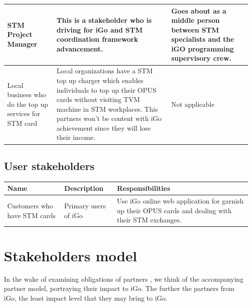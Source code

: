 \documentclass[11pt, english]{report}
\begin{document}
\begin{longtable}[!htbp]{ |p{3cm}|p{7cm}|p{3cm}| }
\hline
STM Project Manager &
This is a stakeholder who is driving for iGo and STM coordination framework advancement. &
Goes about as a middle person between STM specialists and the iGO programming supervisory crew.\\
\hline
Local business who do the top up services for STM card &
  Local organizations have a STM top up charger which enables individuals to top up their OPUS cards without visiting TVM machine in STM workplaces. This partners won't be content with iGo achievement since they will lose their income. \cite{opus_at_home}&


Not applicable\\
\hline

\end{longtable}


\subsection{User stakeholders}
\vspace*{0.1in}
\setlength{\tabcolsep}{18pt}
\renewcommand{\arraystretch}{1.5}
\begin{tabular}{ |p{3cm}|p{4cm}|p{6cm}| }
\hline
Name & Description & Responsibilities\\
\hline

Customers who have STM cards &
Primary users of iGo &
Use iGo online web application for garnish up their OPUS cards and dealing with their STM exchanges. \\

\hline

\end{tabular}

\section{Stakeholders model}
In the wake of examining obligations of partners , we think of the accompanying partner model, portraying their impact to iGo. The further the partners from iGo, the least impact level that they may bring to iGo.
\end{document}
